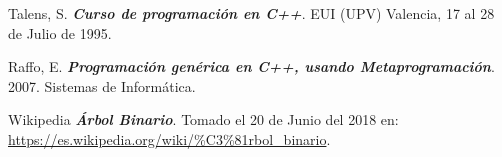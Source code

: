 \begin{thebibliography}{IEEE}
 Talens, S. \textbf{\textit{Curso de programación en C++}}. EUI (UPV) Valencia, 17 al 28 de Julio de 1995. 

 Raffo, E. \textbf{\textit{Programación genérica en C++, usando Metaprogramación}}. 2007. Sistemas de Informática. 

 Wikipedia \textbf{\textit{Árbol Binario}}. Tomado el 20 de Junio del 2018 en: \url{https://es.wikipedia.org/wiki/\%C3\%81rbol_binario}.

\end{thebibliography}